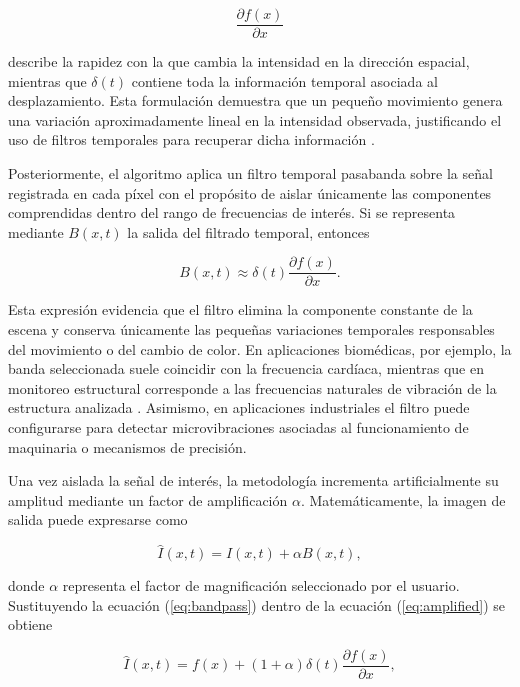\[
\frac{\partial f(x)}{\partial x}
\]

describe la rapidez con la que cambia la intensidad en la dirección espacial, mientras que $\delta(t)$ contiene toda la información temporal asociada al desplazamiento. Esta formulación demuestra que un pequeño movimiento genera una variación aproximadamente lineal en la intensidad observada, justificando el uso de filtros temporales para recuperar dicha información \cite{wu2012eulerian}.

Posteriormente, el algoritmo aplica un filtro temporal pasabanda sobre la señal registrada en cada píxel con el propósito de aislar únicamente las componentes comprendidas dentro del rango de frecuencias de interés. Si se representa mediante $B(x,t)$ la salida del filtrado temporal, entonces

\begin{equation}
B(x,t)\approx
\delta(t)\frac{\partial f(x)}{\partial x}.
\label{eq:bandpass}
\end{equation}

Esta expresión evidencia que el filtro elimina la componente constante de la escena y conserva únicamente las pequeñas variaciones temporales responsables del movimiento o del cambio de color. En aplicaciones biomédicas, por ejemplo, la banda seleccionada suele coincidir con la frecuencia cardíaca, mientras que en monitoreo estructural corresponde a las frecuencias naturales de vibración de la estructura analizada \cite{ahmed2023overview}. Asimismo, en aplicaciones industriales el filtro puede configurarse para detectar microvibraciones asociadas al funcionamiento de maquinaria o mecanismos de precisión.

Una vez aislada la señal de interés, la metodología incrementa artificialmente su amplitud mediante un factor de amplificación $\alpha$. Matemáticamente, la imagen de salida puede expresarse como

\begin{equation}
\hat{I}(x,t)=I(x,t)+\alpha B(x,t),
\label{eq:amplified}
\end{equation}

donde $\alpha$ representa el factor de magnificación seleccionado por el usuario. Sustituyendo la ecuación (\ref{eq:bandpass}) dentro de la ecuación (\ref{eq:amplified}) se obtiene

\begin{equation}
\hat{I}(x,t)
=
f(x)
+
(1+\alpha)
\delta(t)
\frac{\partial f(x)}{\partial x},
\label{eq:final}
\end{equation}

